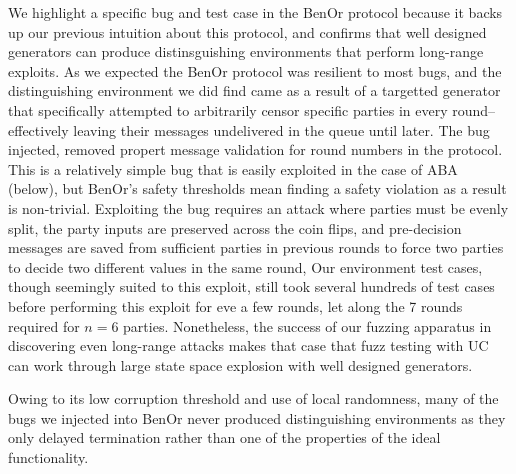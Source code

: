 We highlight a specific bug and test case in the BenOr protocol because it backs up our previous intuition about this protocol, and confirms that well designed generators can produce distinsguishing environments that perform long-range exploits.
As we expected the BenOr protocol was resilient to most bugs, and the distinguishing environment we did find came as a result of a targetted generator that specifically attempted to arbitrarily censor specific parties in every round--effectively leaving their messages undelivered in the queue until later.
The bug injected, removed propert message validation for round numbers in the protocol. This is a relatively simple bug that is easily exploited in the case of ABA (below), but BenOr's safety thresholds mean finding a safety violation as a result is non-trivial.
Exploiting the bug requires an attack where parties must be evenly split, the party inputs are preserved across the coin flips, and pre-decision messages are saved from sufficient parties in previous rounds to force two parties to decide two different values in the same round,
Our environment test cases, though seemingly suited to this exploit, still took several hundreds of test cases before performing this exploit for eve a few rounds, let along the 7 rounds required for $n=6$ parties.
Nonetheless, the success of our fuzzing apparatus in discovering even long-range attacks makes that case that fuzz testing with UC can work through large state space explosion with well designed generators. 

Owing to its low corruption threshold and use of local randomness, many of the bugs we injected into BenOr never produced distinguishing environments as they only delayed termination rather than one of the properties of the ideal functionality.



